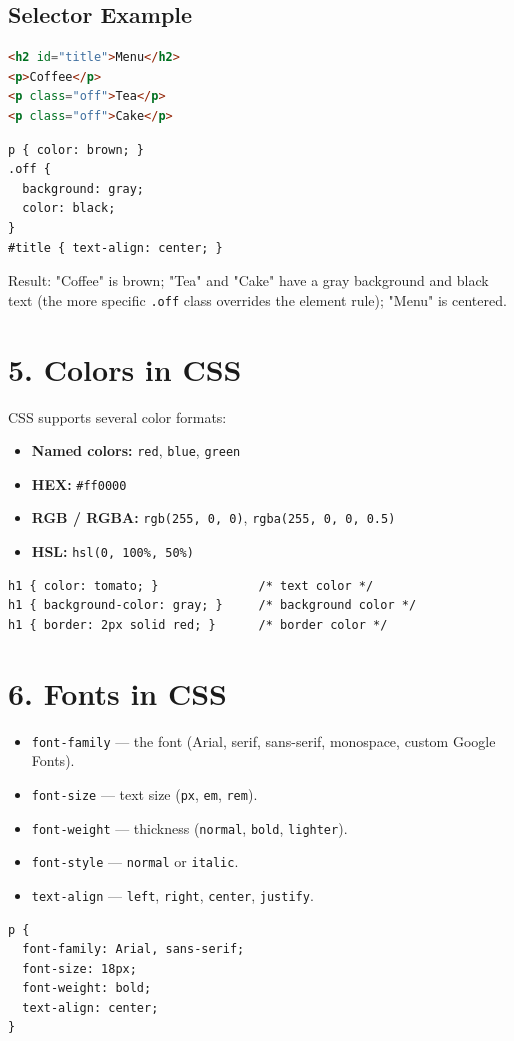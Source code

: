 \documentclass[12pt]{article}
\begin{document}
\subsection{Selector Example}
\begin{lstlisting}[language=HTML]
<h2 id="title">Menu</h2>
<p>Coffee</p>
<p class="off">Tea</p>
<p class="off">Cake</p>
\end{lstlisting}
\begin{lstlisting}
p { color: brown; }
.off {
  background: gray;
  color: black;
}
#title { text-align: center; }
\end{lstlisting}
Result: "Coffee" is brown; "Tea" and "Cake" have a gray background and black text (the more specific \texttt{.off} class overrides the element rule); "Menu" is centered.

\section{5. Colors in CSS}
CSS supports several color formats:
\begin{itemize}
    \item \textbf{Named colors:} \texttt{red}, \texttt{blue}, \texttt{green}
    \item \textbf{HEX:} \texttt{\#ff0000}
    \item \textbf{RGB / RGBA:} \texttt{rgb(255, 0, 0)}, \texttt{rgba(255, 0, 0, 0.5)}
    \item \textbf{HSL:} \texttt{hsl(0, 100\%, 50\%)}
\end{itemize}
\begin{lstlisting}
h1 { color: tomato; }              /* text color */
h1 { background-color: gray; }     /* background color */
h1 { border: 2px solid red; }      /* border color */
\end{lstlisting}

\section{6. Fonts in CSS}
\begin{itemize}
    \item \texttt{font-family} — the font (Arial, serif, sans-serif, monospace, custom Google Fonts).
    \item \texttt{font-size} — text size (\texttt{px}, \texttt{em}, \texttt{rem}).
    \item \texttt{font-weight} — thickness (\texttt{normal}, \texttt{bold}, \texttt{lighter}).
    \item \texttt{font-style} — \texttt{normal} or \texttt{italic}.
    \item \texttt{text-align} — \texttt{left}, \texttt{right}, \texttt{center}, \texttt{justify}.
\end{itemize}
\begin{lstlisting}
p {
  font-family: Arial, sans-serif;
  font-size: 18px;
  font-weight: bold;
  text-align: center;
}
\end{lstlisting}
\end{document}
